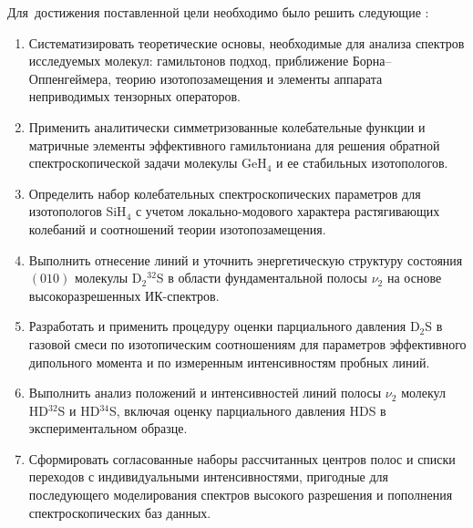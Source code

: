 Для~достижения поставленной цели необходимо было решить следующие {\tasks}:
\begin{enumerate}[beginpenalty=10000]
  \item Систематизировать теоретические основы, необходимые для анализа спектров исследуемых молекул:
  гамильтонов подход, приближение Борна--Оппенгеймера, теорию изотопозамещения и элементы аппарата
  неприводимых тензорных операторов.
  \item Применить аналитически симметризованные колебательные функции и матричные элементы
  эффективного гамильтониана для решения обратной спектроскопической задачи молекулы GeH$_4$ и ее
  стабильных изотопологов.
  \item Определить набор колебательных спектроскопических параметров для изотопологов SiH$_4$ с учетом
  локально-модового характера растягивающих колебаний и соотношений теории изотопозамещения.
  \item Выполнить отнесение линий и уточнить энергетическую структуру состояния $(010)$ молекулы
  D$_2{}^{32}$S в области фундаментальной полосы $\nu_2$ на основе высокоразрешенных ИК-спектров.
  \item Разработать и применить процедуру оценки парциального давления D$_2$S в газовой смеси по
  изотопическим соотношениям для параметров эффективного дипольного момента и по измеренным
  интенсивностям пробных линий.
  \item Выполнить анализ положений и интенсивностей линий полосы $\nu_2$ молекул HD$^{32}$S и
  HD$^{34}$S, включая оценку парциального давления HDS в экспериментальном образце.
  \item Сформировать согласованные наборы рассчитанных центров полос и списки переходов с
  индивидуальными интенсивностями, пригодные для последующего моделирования спектров высокого
  разрешения и пополнения спектроскопических баз данных.
\end{enumerate}

